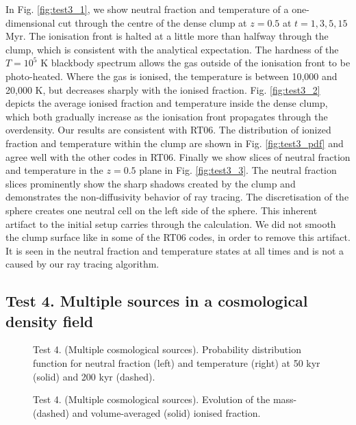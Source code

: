 \documentclass[useAMS,usenatbib]{mn2e}
\begin{document}
In Fig. \ref{fig:test3_1}, we show neutral fraction and temperature of
a one-dimensional cut through the centre of the dense clump at $z =
0.5$ at $t = 1, 3, 5, 15$ Myr.  The ionisation front is halted at a
little more than halfway through the clump, which is consistent with
the analytical expectation.  The hardness of the $T = 10^5$ K
blackbody spectrum allows the gas outside of the ionisation front to
be photo-heated.  Where the gas is ionised, the temperature is between
10,000 and 20,000 K, but decreases sharply with the ionised fraction.
Fig. \ref{fig:test3_2} depicts the average ionised fraction and
temperature inside the dense clump, which both gradually increase as
the ionisation front propagates through the overdensity.  Our results
are consistent with RT06.  The distribution of ionized fraction and
temperature within the clump are shown in Fig. \ref{fig:test3_pdf} and
agree well with the other codes in RT06.  Finally we show slices of
neutral fraction and temperature in the $z = 0.5$ plane in
Fig. \ref{fig:test3_3}.  The neutral fraction slices prominently show
the sharp shadows created by the clump and demonstrates the
non-diffusivity behavior of ray tracing.  The discretisation of the
sphere creates one neutral cell on the left side of the sphere.  This
inherent artifact to the initial setup carries through the
calculation.  We did not smooth the clump surface like in some of the
RT06 codes, in order to remove this artifact.  It is seen in the
neutral fraction and temperature states at all times and is not a
caused by our ray tracing algorithm.

\subsection{Test 4. Multiple sources in a cosmological density field}

\begin{figure}
  \caption{\label{fig:test4_pdf} Test 4. (Multiple cosmological
    sources). Probability distribution function for neutral fraction
    (left) and temperature (right) at 50 kyr (solid) and 200 kyr
    (dashed).}
\end{figure}

\begin{figure}
  \caption{\label{fig:test4_1} Test 4. (Multiple cosmological
    sources).  Evolution of the mass- (dashed) and volume-averaged
    (solid) ionised fraction.}
\end{figure}
\end{document}
